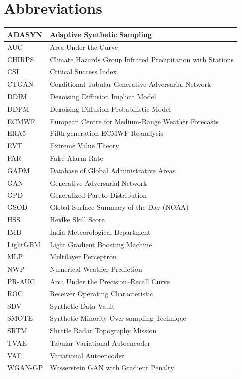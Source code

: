 \documentclass[12pt,a4paper]{report}
\begin{document}
\chapter*{Abbreviations}
\begin{center}
\begin{tabularx}{\textwidth}{|p{3.2cm}|X|}
\hline
ADASYN & Adaptive Synthetic Sampling \\ \hline
AUC & Area Under the Curve \\ \hline
CHIRPS & Climate Hazards Group Infrared Precipitation with Stations \\ \hline
CSI & Critical Success Index \\ \hline
CTGAN & Conditional Tabular Generative Adversarial Network \\ \hline
DDIM & Denoising Diffusion Implicit Model \\ \hline
DDPM & Denoising Diffusion Probabilistic Model \\ \hline
ECMWF & European Centre for Medium-Range Weather Forecasts \\ \hline
ERA5 & Fifth-generation ECMWF Reanalysis \\ \hline
EVT & Extreme Value Theory \\ \hline
FAR & False-Alarm Rate \\ \hline
GADM & Database of Global Administrative Areas \\ \hline
GAN & Generative Adversarial Network \\ \hline
GPD & Generalized Pareto Distribution \\ \hline
GSOD & Global Surface Summary of the Day (NOAA) \\ \hline
HSS & Heidke Skill Score \\ \hline
IMD & India Meteorological Department \\ \hline
LightGBM & Light Gradient Boosting Machine \\ \hline
MLP & Multilayer Perceptron \\ \hline
NWP & Numerical Weather Prediction \\ \hline
PR-AUC & Area Under the Precision--Recall Curve \\ \hline
ROC & Receiver Operating Characteristic \\ \hline
SDV & Synthetic Data Vault \\ \hline
SMOTE & Synthetic Minority Over-sampling Technique \\ \hline
SRTM & Shuttle Radar Topography Mission \\ \hline
TVAE & Tabular Variational Autoencoder \\ \hline
VAE & Variational Autoencoder \\ \hline
WGAN-GP & Wasserstein GAN with Gradient Penalty \\ \hline
\end{tabularx}
\end{center}
\end{document}
